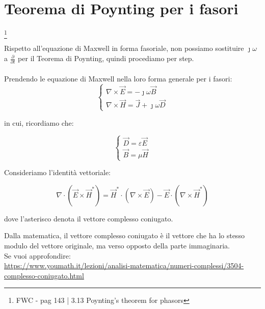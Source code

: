 \newpage 

\section{Teorema di Poynting per i fasori} 

\footnote{FWC - pag 143 | 3.13 Poynting's theorem for phasors} 

Rispetto all'equazione di Maxwell in forma fasoriale, non possiamo sostituire $\jmath \omega$ a $\frac{\partial}{\partial t}$ per il 
Teorema di Poynting, quindi procediamo per step. \\ \\ 

Prendendo le equazione di Maxwell nella loro forma generale per i fasori: \\ 

{\Large \begin{equation}
    \begin{cases}
        \nabla \times \vec{E} = - \jmath \omega \vec{B} \\ 
        \nabla \times \vec{H} = \vec{J} + \jmath \omega \vec{D}
    \end{cases}
\end{equation}}

in cui, ricordiamo che: 

{
    \Large
    \begin{equation}
        \begin{cases}    
\vec{D} = \varepsilon \vec{E} 
\\
\vec{B} = \mu \vec{H}        
        \end{cases}
    \end{equation}
}

Consideriamo l'identità vettoriale: 

{
    \Large
    \begin{equation}
    \nabla \cdot (\vec{E}  \times \vec{H}^{*}) = \vec{H} ^{*} \cdot (\nabla \times \vec{E}) - \vec{E} \cdot (\nabla \times \vec{H} ^{*})        
    \end{equation}
}

dove l'asterisco denota il vettore complesso coniugato. 

\begin{tcolorbox}
    Dalla matematica, il vettore complesso coniugato è il vettore che ha lo stesso modulo del vettore originale, ma 
    verso opposto della parte immaginaria. \\ 

    Se vuoi approfondire: \\ \url{https://www.youmath.it/lezioni/analisi-matematica/numeri-complessi/3504-complesso-coniugato.html}


\end{tcolorbox}  

